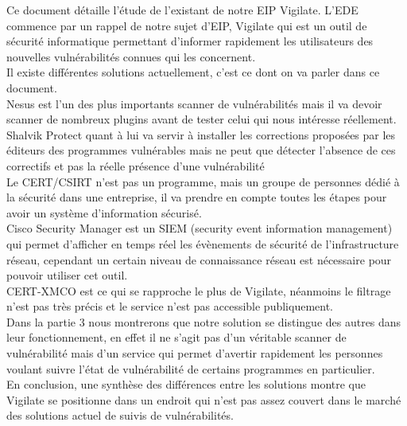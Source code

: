 Ce document détaille l'étude de l'existant de notre EIP Vigilate. L'EDE commence par un rappel de notre sujet d'EIP, Vigilate qui est un outil de sécurité informatique permettant d'informer rapidement les utilisateurs des nouvelles vulnérabilités connues qui les concernent.\\
Il existe différentes solutions actuellement, c’est ce dont on va parler dans ce document.\\
Nesus est l’un des plus importants scanner de vulnérabilités mais il va devoir scanner de nombreux plugins avant de tester celui qui nous intéresse réellement.\\
Shalvik Protect quant à lui va servir à installer les corrections proposées par les éditeurs des programmes vulnérables mais ne peut que détecter l’absence de ces correctifs et pas la réelle présence d’une vulnérabilité\\
Le CERT/CSIRT n’est pas un programme, mais un groupe de personnes dédié à la sécurité dans une entreprise, il va prendre en compte toutes les étapes pour avoir un système d’information sécurisé.\\
Cisco Security Manager est un SIEM (security event information management) qui permet d’afficher en temps réel les évènements de sécurité de l'infrastructure réseau, cependant un certain niveau de connaissance réseau est nécessaire pour pouvoir utiliser cet outil.\\
CERT-XMCO est ce qui se rapproche le plus de Vigilate, néanmoins le filtrage n’est pas très précis et le service n’est pas accessible publiquement.\\
Dans la partie 3 nous montrerons que notre solution se distingue des autres dans leur fonctionnement, en effet il ne s’agit pas d’un véritable scanner de vulnérabilité mais d’un service qui permet d’avertir rapidement les personnes voulant suivre l’état de vulnérabilité de certains programmes en particulier.\\
En conclusion, une synthèse des différences entre les solutions montre que Vigilate se positionne dans un endroit qui n’est pas assez couvert dans le marché des solutions actuel de suivis de vulnérabilités.\\